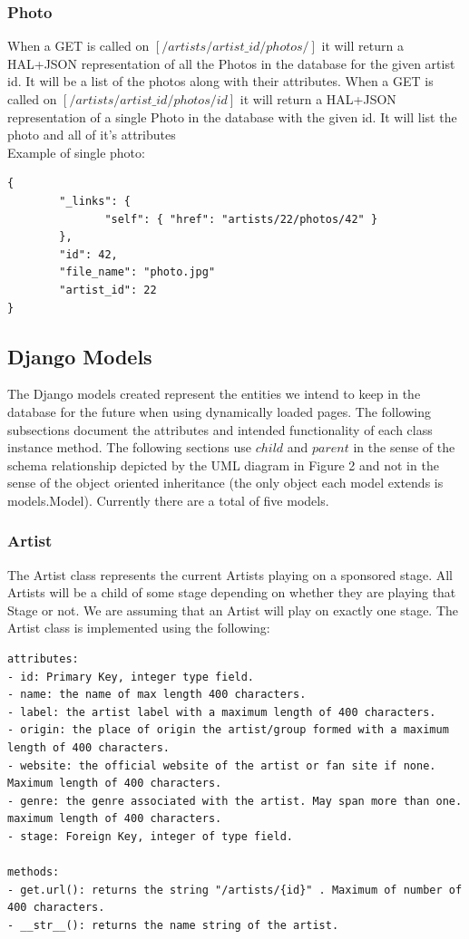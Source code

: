 \documentclass[12pt,english]{scrartcl}
\begin{document}
\subsubsection{Photo}
When a GET is called on $[/artists/{artist\_id}/photos/]$ it will return a HAL+JSON representation of all the Photos in the database for the given artist id.  It will be a list of the photos along with their attributes.
When a GET is called on $[/artists/{artist\_id}/photos/{id}]$ it will return a HAL+JSON representation of a single Photo in the database with the given id.  It will list the photo and all of it's attributes
\\
Example of single photo:
\begin{verbatim}
{
        "_links": {
               "self": { "href": "artists/22/photos/42" }
        },
        "id": 42,
        "file_name": "photo.jpg"
        "artist_id": 22
}
\end{verbatim}

\subsection{Django Models}
The Django models created represent the entities we intend to keep in the database for the future when using dynamically loaded pages.
The following subsections document the attributes and intended functionality of each class instance method. The following sections use
$child$ and $parent$ in the sense of the schema relationship depicted by the UML diagram in Figure 2 and not in the sense of the object oriented inheritance 
(the only object each model extends is models.Model). Currently there are a total of five models.

\subsubsection{Artist}
The Artist class represents the current Artists playing on a sponsored stage. All Artists will be a child of some
stage depending on whether they are playing that Stage or not. We are assuming that an Artist will play on 
exactly one stage. The Artist class is implemented using the following:
\begin{verbatim}
attributes:
- id: Primary Key, integer type field.
- name: the name of max length 400 characters.
- label: the artist label with a maximum length of 400 characters.
- origin: the place of origin the artist/group formed with a maximum length of 400 characters.
- website: the official website of the artist or fan site if none. Maximum length of 400 characters.
- genre: the genre associated with the artist. May span more than one. maximum length of 400 characters.
- stage: Foreign Key, integer of type field.

methods:
- get.url(): returns the string "/artists/{id}" . Maximum of number of 400 characters.
- __str__(): returns the name string of the artist.
\end{verbatim}
\end{document}

